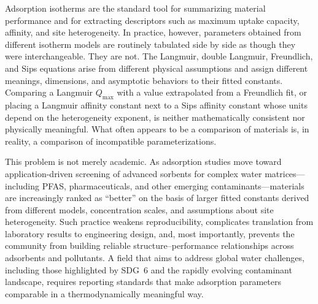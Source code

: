 \documentclass[journal=jacsat,manuscript=article]{achemso}
\begin{document}
	Adsorption isotherms are the standard tool for summarizing material performance and for extracting descriptors such as maximum uptake capacity, affinity, and site heterogeneity. In practice, however, parameters obtained from different isotherm models are routinely tabulated side by side as though they were interchangeable. They are not. The Langmuir, double Langmuir, Freundlich, and Sips equations arise from different physical assumptions and assign different meanings, dimensions, and asymptotic behaviors to their fitted constants.\cite{langmuir_adsorption_1918,freundlich_uber_1907,sips_structure_1948} Comparing a Langmuir $Q_\mathrm{max}$ with a value extrapolated from a Freundlich fit, or placing a Langmuir affinity constant next to a Sips affinity constant whose units depend on the heterogeneity exponent, is neither mathematically consistent nor physically meaningful.\cite{latour_langmuir_2015,de_vargas_briao_sips_2023} What often appears to be a comparison of materials is, in reality, a comparison of incompatible parameterizations.\cite{foo_insights_2010}

	This problem is not merely academic. As adsorption studies move toward application-driven screening of advanced sorbents for complex water matrices---including PFAS, pharmaceuticals, and other emerging contaminants---materials are increasingly ranked as ``better'' on the basis of larger fitted constants derived from different models, concentration scales, and assumptions about site heterogeneity. Such practice weakens reproducibility, complicates translation from laboratory results to engineering design, and, most importantly, prevents the community from building reliable structure--performance relationships across adsorbents and pollutants. A field that aims to address global water challenges, including those highlighted by SDG~6 and the rapidly evolving contaminant landscape, requires reporting standards that make adsorption parameters comparable in a thermodynamically meaningful way.
	
\end{document}
